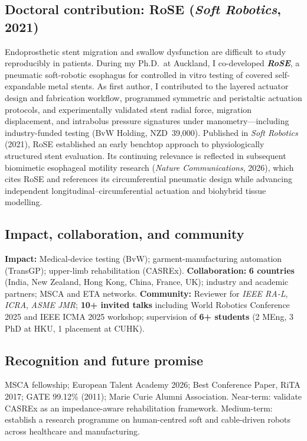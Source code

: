 \documentclass[11pt,a4paper]{article}
\newcommand{\btit}[1]{\textbf{\textit{#1}}}
\begin{document}
\subsection*{Doctoral contribution: RoSE (\textit{Soft Robotics}, 2021)}
Endoprosthetic stent migration and swallow dysfunction are difficult to study reproducibly in patients. During my Ph.D.\ at Auckland, I co-developed \btit{RoSE}, a pneumatic soft-robotic esophagus for controlled in vitro testing of covered self-expandable metal stents. As first author, I contributed to the layered actuator design and fabrication workflow, programmed symmetric and peristaltic actuation protocols, and experimentally validated stent radial force, migration displacement, and intrabolus pressure signatures under manometry---including industry-funded testing (BvW Holding, NZD~39,000). Published in \textit{Soft Robotics} (2021), RoSE established an early benchtop approach to physiologically structured stent evaluation. Its continuing relevance is reflected in subsequent biomimetic esophageal motility research (\textit{Nature Communications}, 2026), which cites RoSE and references its circumferential pneumatic design while advancing independent longitudinal--circumferential actuation and biohybrid tissue modelling.

\subsection*{Impact, collaboration, and community}
\textbf{Impact:} Medical-device testing (BvW); garment-manufacturing automation (TransGP); upper-limb rehabilitation (CASREx). \textbf{Collaboration:} \textbf{6 countries} (India, New Zealand, Hong Kong, China, France, UK); industry and academic partners; MSCA and ETA networks. \textbf{Community:} Reviewer for \textit{IEEE RA-L}, \textit{ICRA}, \textit{ASME JMR}; \textbf{10+ invited talks} including World Robotics Conference 2025 and IEEE ICMA 2025 workshop; supervision of \textbf{6+ students} (2 MEng, 3 PhD at HKU, 1 placement at CUHK).

\subsection*{Recognition and future promise}
MSCA fellowship; European Talent Academy 2026; Best Conference Paper, RiTA 2017; GATE 99.12\% (2011); Marie Curie Alumni Association. Near-term: validate CASREx as an impedance-aware rehabilitation framework. Medium-term: establish a research programme on human-centred soft and cable-driven robots across healthcare and manufacturing.
\end{document}
